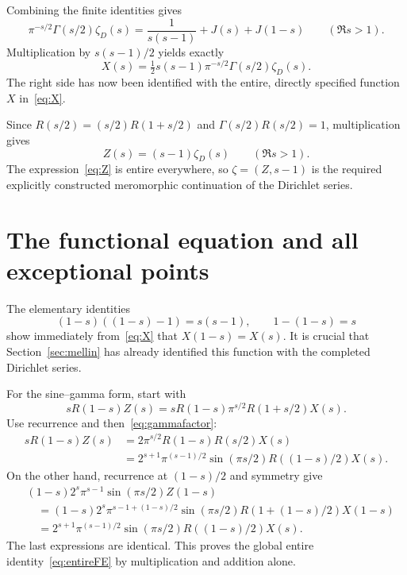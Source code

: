 \documentclass[11pt,letterpaper]{article}
\numberwithin{equation}{section}
\theoremstyle{definition}
\newcommand{\gamrec}{R}
\begin{document}
Combining the finite identities gives
\begin{equation}
 \pi^{-s/2}\Gamma(s/2)\zeta_D(s)
        =\frac1{s(s-1)}+J(s)+J(1-s)
                    \qquad(\Re s>1).                     \label{eq:regularizedMellin}
\end{equation}
Multiplication by \(s(s-1)/2\) yields exactly
\begin{equation}
 X(s)=\tfrac12s(s-1)\pi^{-s/2}\Gamma(s/2)\zeta_D(s).
 \label{eq:xiIdentification}
\end{equation}
The right side has now been identified with the entire, directly
specified function \(X\) in~\eqref{eq:X}.

Since \(\gamrec(s/2)=(s/2)\gamrec(1+s/2)\) and
\(\Gamma(s/2)\gamrec(s/2)=1\), multiplication gives
\begin{equation}
                  Z(s)=(s-1)\zeta_D(s)\qquad(\Re s>1).
 \label{eq:ZIdentification}
\end{equation}
The expression~\eqref{eq:Z} is entire everywhere, so
\(\zeta=(Z,s-1)\) is the required explicitly constructed
meromorphic continuation of the Dirichlet series.

\section{The functional equation and all exceptional points}\label{sec:FE}

The elementary identities
\[
 (1-s)((1-s)-1)=s(s-1),\qquad 1-(1-s)=s
\]
show immediately from~\eqref{eq:X} that \(X(1-s)=X(s)\).
It is crucial that Section~\ref{sec:mellin} has already identified
this function with the completed Dirichlet series.

For the sine--gamma form, start with
\[
 s\gamrec(1-s)Z(s)
       =s\gamrec(1-s)\pi^{s/2}\gamrec(1+s/2)X(s).
\]
Use recurrence and then~\eqref{eq:gammafactor}:
\begin{align}
 s\gamrec(1-s)Z(s)
 &=2\pi^{s/2}\gamrec(1-s)\gamrec(s/2)X(s)\\
 &=2^{s+1}\pi^{(s-1)/2}
                  \sin(\pi s/2)\gamrec((1-s)/2)X(s).
 \label{eq:FEleft}
\end{align}
On the other hand, recurrence at \((1-s)/2\) and symmetry give
\begin{align}
 &(1-s)2^s\pi^{s-1}\sin(\pi s/2)Z(1-s)\\
 &\quad=(1-s)2^s\pi^{s-1+(1-s)/2}\sin(\pi s/2)
                    \gamrec(1+(1-s)/2)X(1-s)\\
 &\quad=2^{s+1}\pi^{(s-1)/2}
                    \sin(\pi s/2)\gamrec((1-s)/2)X(s).
 \label{eq:FEright}
\end{align}
The last expressions are identical. This proves the global entire
identity~\eqref{eq:entireFE} by multiplication and addition alone.
\end{document}
